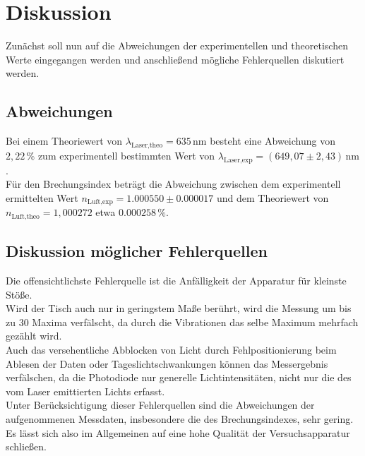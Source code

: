 \section{Diskussion}
\label{sec:Diskussion}

Zunächst soll nun auf die Abweichungen der experimentellen und theoretischen Werte eingegangen werden und anschließend mögliche Fehlerquellen diskutiert werden.

\subsection{Abweichungen}

Bei einem Theoriewert von $\lambda_\text{Laser,theo} = 635 \,\si{\nano\meter}$ besteht eine Abweichung von $2,22 \,\%$ zum experimentell bestimmten Wert von
$\lambda_\text{Laser,exp} = (649,07 \pm 2,43) \,\si{\nano\meter}$. \\

Für den Brechungsindex beträgt die Abweichung zwischen dem experimentell ermittelten Wert $n_\text{Luft,exp} = 1.000550 \pm 0.000017$ und dem Theoriewert von $n_\text{Luft,theo} = 1,000272$ etwa $0.000258 \,\%$. \\


\subsection{Diskussion möglicher Fehlerquellen}

Die offensichtlichste Fehlerquelle ist die Anfälligkeit der Apparatur für kleinste Stöße. \\
Wird der Tisch auch nur in geringstem Maße berührt, wird die Messung um bis zu $30$ Maxima verfälscht, da durch die Vibrationen das selbe Maximum mehrfach gezählt wird. \\

Auch das versehentliche Abblocken von Licht durch Fehlpositionierung beim Ablesen der Daten oder Tageslichtschwankungen können das Messergebnis verfälschen, da die Photodiode nur generelle Lichtintensitäten,
nicht nur die des vom Laser emittierten Lichts erfasst. \\

Unter Berücksichtigung dieser Fehlerquellen sind die Abweichungen der aufgenommenen Messdaten, insbesondere die des Brechungsindexes, sehr gering.
Es lässt sich also im Allgemeinen auf eine hohe Qualität der Versuchsapparatur schließen.
